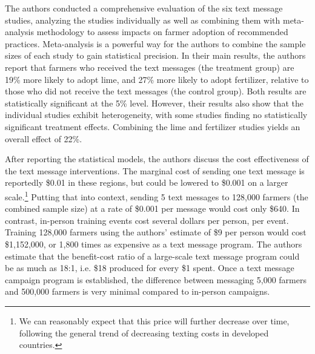 \documentclass[12pt]{article}
\begin{document}
The authors conducted a comprehensive evaluation of the six text message studies, analyzing the studies individually as well as combining them with meta-analysis methodology to assess impacts on farmer adoption of recommended practices. Meta-analysis is a powerful way for the authors to combine the sample sizes of each study to gain statistical precision. In their main results, the authors report that farmers who received the text messages (the treatment group) are 19\% more likely to adopt lime, and 27\% more likely to adopt fertilizer, relative to those who did not receive the text messages (the control group). Both results are statistically significant at the 5\% level. However, their results also show that the individual studies exhibit heterogeneity, with some studies finding no statistically significant treatment effects. Combining the lime and fertilizer studies yields an overall effect of 22\%.

After reporting the statistical models, the authors discuss the cost effectiveness of the text message interventions. The marginal cost of sending one text message is reportedly \$0.01 in these regions, but could be lowered to \$0.001 on a larger scale.\footnote{We can reasonably expect that this price will further decrease over time, following the general trend of decreasing texting costs in developed countries.} Putting that into context, sending 5 text messages to 128,000 farmers (the combined sample size) at a rate of \$0.001 per message would cost only \$640. In contrast, in-person training events cost several dollars per person, per event. Training 128,000 farmers using the authors' estimate of \$9 per person would cost \$1,152,000, or 1,800 times as expensive as a text message program. The authors estimate that the benefit-cost ratio of a large-scale text message program could be as much as 18:1, i.e. \$18 produced for every \$1 spent. Once a text message campaign program is established, the difference between messaging 5,000 farmers and 500,000 farmers is very minimal compared to in-person campaigns.
\end{document}
